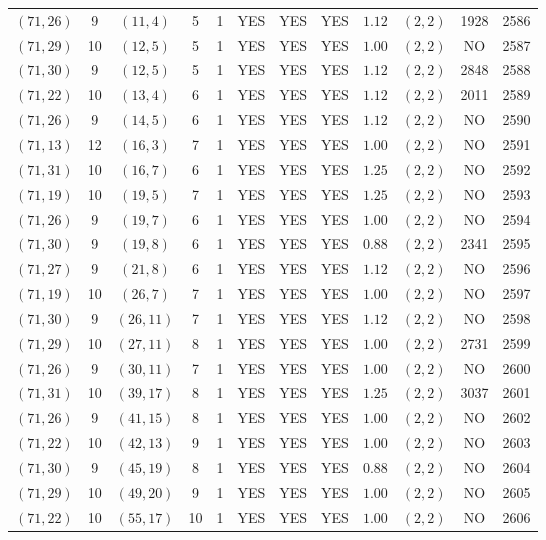 \begin{longtable}{|c|c|c|c|c|c|c|c|c|c|c|c|}
$(71,26)$ & 9 & $(11,4)$ & 5 & 1 & YES & YES & YES & $1.12$ & $(2,2)$ & 1928 & 2586\\
$(71,29)$ & 10 & $(12,5)$ & 5 & 1 & YES & YES & YES & $1.00$ & $(2,2)$ & NO & 2587\\
$(71,30)$ & 9 & $(12,5)$ & 5 & 1 & YES & YES & YES & $1.12$ & $(2,2)$ & 2848 & 2588\\
$(71,22)$ & 10 & $(13,4)$ & 6 & 1 & YES & YES & YES & $1.12$ & $(2,2)$ & 2011 & 2589\\
$(71,26)$ & 9 & $(14,5)$ & 6 & 1 & YES & YES & YES & $1.12$ & $(2,2)$ & NO & 2590\\
$(71,13)$ & 12 & $(16,3)$ & 7 & 1 & YES & YES & YES & $1.00$ & $(2,2)$ & NO & 2591\\
$(71,31)$ & 10 & $(16,7)$ & 6 & 1 & YES & YES & YES & $1.25$ & $(2,2)$ & NO & 2592\\
$(71,19)$ & 10 & $(19,5)$ & 7 & 1 & YES & YES & YES & $1.25$ & $(2,2)$ & NO & 2593\\
$(71,26)$ & 9 & $(19,7)$ & 6 & 1 & YES & YES & YES & $1.00$ & $(2,2)$ & NO & 2594\\
$(71,30)$ & 9 & $(19,8)$ & 6 & 1 & YES & YES & YES & $0.88$ & $(2,2)$ & 2341 & 2595\\
$(71,27)$ & 9 & $(21,8)$ & 6 & 1 & YES & YES & YES & $1.12$ & $(2,2)$ & NO & 2596\\
$(71,19)$ & 10 & $(26,7)$ & 7 & 1 & YES & YES & YES & $1.00$ & $(2,2)$ & NO & 2597\\
$(71,30)$ & 9 & $(26,11)$ & 7 & 1 & YES & YES & YES & $1.12$ & $(2,2)$ & NO & 2598\\
$(71,29)$ & 10 & $(27,11)$ & 8 & 1 & YES & YES & YES & $1.00$ & $(2,2)$ & 2731 & 2599\\
$(71,26)$ & 9 & $(30,11)$ & 7 & 1 & YES & YES & YES & $1.00$ & $(2,2)$ & NO & 2600\\
$(71,31)$ & 10 & $(39,17)$ & 8 & 1 & YES & YES & YES & $1.25$ & $(2,2)$ & 3037 & 2601\\
$(71,26)$ & 9 & $(41,15)$ & 8 & 1 & YES & YES & YES & $1.00$ & $(2,2)$ & NO & 2602\\
$(71,22)$ & 10 & $(42,13)$ & 9 & 1 & YES & YES & YES & $1.00$ & $(2,2)$ & NO & 2603\\
$(71,30)$ & 9 & $(45,19)$ & 8 & 1 & YES & YES & YES & $0.88$ & $(2,2)$ & NO & 2604\\
$(71,29)$ & 10 & $(49,20)$ & 9 & 1 & YES & YES & YES & $1.00$ & $(2,2)$ & NO & 2605\\
$(71,22)$ & 10 & $(55,17)$ & 10 & 1 & YES & YES & YES & $1.00$ & $(2,2)$ & NO & 2606\\

\end{longtable}
